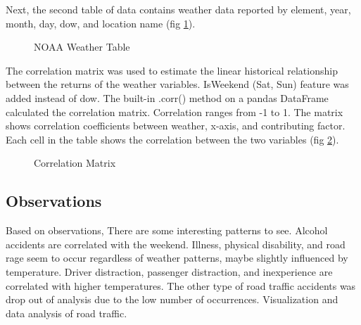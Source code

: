 \documentclass[conference]{IEEEtran}
\begin{document}
\newline \newline
Next, the second table of data contains weather data reported by element, year, month, day, dow, and location name (fig \ref{fig:noaatable}).
\begin{figure}[bth]
	\centering
	\caption{NOAA Weather Table}
	\label{fig:noaatable}
\end{figure}
\newline 
The correlation matrix was used to estimate the linear historical relationship between the returns of the weather variables. IsWeekend (Sat, Sun) feature was added instead of dow. The built-in .corr() method on a pandas DataFrame calculated the correlation matrix. Correlation ranges from -1 to 1. The matrix shows correlation coefficients between weather, x-axis, and contributing factor. Each cell in the table shows the correlation between the two variables (fig \ref{fig:cormap}). 

\begin{figure}[bth]
	\centering
	\caption{Correlation Matrix}
	\label{fig:cormap}
\end{figure}

\subsection{Observations}
Based on observations, There are some interesting patterns to see. Alcohol accidents are correlated with the weekend. Illness, physical disability, and road rage seem to occur regardless of weather patterns, maybe slightly influenced by temperature. Driver distraction, passenger distraction, and inexperience are correlated with higher temperatures. The other type of road traffic accidents was drop out of analysis due to the low number of occurrences. Visualization and data analysis of road traffic. 
\end{document}
